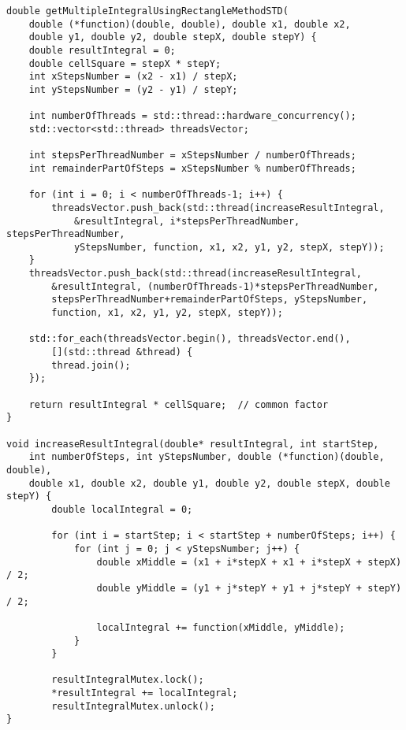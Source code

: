 \documentclass{article}
\begin{document}
\vspace{10pt}
\begin{lstlisting}
double getMultipleIntegralUsingRectangleMethodSTD(
    double (*function)(double, double), double x1, double x2,
    double y1, double y2, double stepX, double stepY) {
    double resultIntegral = 0;
    double cellSquare = stepX * stepY;
    int xStepsNumber = (x2 - x1) / stepX;
    int yStepsNumber = (y2 - y1) / stepY;

    int numberOfThreads = std::thread::hardware_concurrency();
    std::vector<std::thread> threadsVector;

    int stepsPerThreadNumber = xStepsNumber / numberOfThreads;
    int remainderPartOfSteps = xStepsNumber % numberOfThreads;

    for (int i = 0; i < numberOfThreads-1; i++) {
        threadsVector.push_back(std::thread(increaseResultIntegral,
            &resultIntegral, i*stepsPerThreadNumber, stepsPerThreadNumber,
            yStepsNumber, function, x1, x2, y1, y2, stepX, stepY));
    }
    threadsVector.push_back(std::thread(increaseResultIntegral,
        &resultIntegral, (numberOfThreads-1)*stepsPerThreadNumber,
        stepsPerThreadNumber+remainderPartOfSteps, yStepsNumber,
        function, x1, x2, y1, y2, stepX, stepY));

    std::for_each(threadsVector.begin(), threadsVector.end(),
        [](std::thread &thread) {
        thread.join();
    });

    return resultIntegral * cellSquare;  // common factor
}

void increaseResultIntegral(double* resultIntegral, int startStep,
    int numberOfSteps, int yStepsNumber, double (*function)(double, double),
    double x1, double x2, double y1, double y2, double stepX, double stepY) {
        double localIntegral = 0;

        for (int i = startStep; i < startStep + numberOfSteps; i++) {
            for (int j = 0; j < yStepsNumber; j++) {
                double xMiddle = (x1 + i*stepX + x1 + i*stepX + stepX) / 2;
                double yMiddle = (y1 + j*stepY + y1 + j*stepY + stepY) / 2;

                localIntegral += function(xMiddle, yMiddle);
            }
        }

        resultIntegralMutex.lock();
        *resultIntegral += localIntegral;
        resultIntegralMutex.unlock();
}
\end{lstlisting}

\newpage
\end{document}

